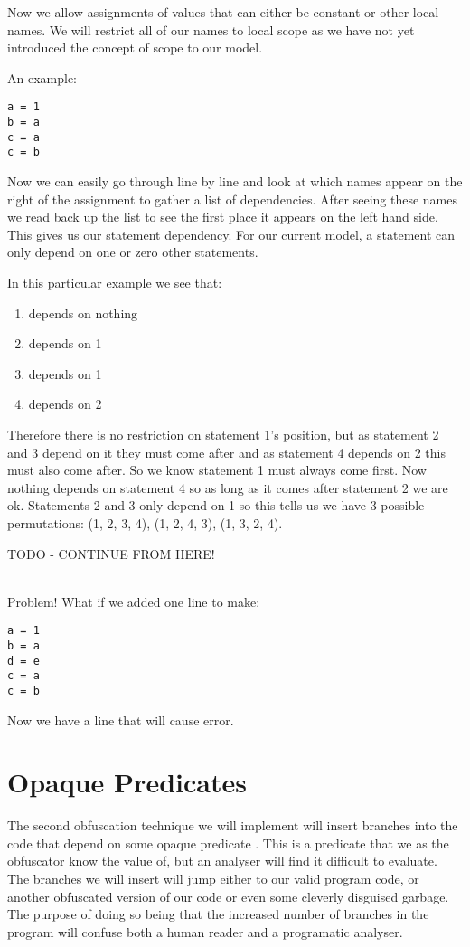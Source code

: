 \documentclass{report}
\begin{document}
Now we allow assignments of values that can either be constant or other local names. We will restrict all of our names to local scope as
we have not yet introduced the concept of scope to our model.

An example:

\begin{lstlisting}
a = 1
b = a
c = a
c = b
\end{lstlisting}

Now we can easily go through line by line and look at which names appear on the right of the assignment to gather a list of dependencies.
After seeing these names we read back up the list to see the first place it appears on the left hand side. This gives us our statement dependency.
For our current model, a statement can only depend on one or zero other statements.

In this particular example we see that:

\begin{enumerate}
\item depends on nothing
\item depends on 1
\item depends on 1
\item depends on 2
\end{enumerate}

Therefore there is no restriction on statement 1's position, but as statement 2 and 3 depend on it they must come after and as statement 4 depends on 2
this must also come after. So we know statement 1 must always come first. Now nothing depends on statement 4 so as long as it comes after statement 2 we
are ok. Statements 2 and 3 only depend on 1 so this tells us we have 3 possible permutations: (1, 2, 3, 4), (1, 2, 4, 3), (1, 3, 2, 4).

TODO - CONTINUE FROM HERE!-------------------------------------------------------------

Problem! What if we added one line to make:

\begin{lstlisting}
a = 1
b = a
d = e
c = a
c = b
\end{lstlisting}

Now we have a line that will cause error. 

\section{Opaque Predicates}

The second obfuscation technique we will implement will insert branches into the code that depend on
some opaque predicate \cite{taxobftrans}. This is a predicate that we as the obfuscator know the value of,
but an analyser will find it difficult to evaluate. The branches we will insert will jump either to our valid
program code, or another obfuscated version of our code or even some cleverly disguised garbage. The purpose of doing so being
that the increased number of branches in the program will confuse both a human reader and a programatic analyser.
\end{document}

